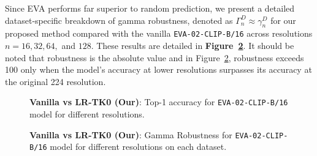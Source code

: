 Since EVA performs far superior to random prediction, we present a detailed dataset-specific breakdown of gamma robustness, denoted as $\Gamma^{D}_{n} \approx \gamma^{D}_{n}$ for our proposed method compared with the vanilla \texttt{EVA-02-CLIP-B/16} across resolutions $n = 16, 32, 64,$ and $128$. These results are detailed in \textbf{Figure~\ref{fig:gamma_variation}}. It should be noted that robustness is the absolute value and in Figure~\ref{fig:gamma_variation}, robustness exceeds 100 only when the model's accuracy at lower resolutions surpasses its accuracy at the original 224 resolution.



\begin{figure}[!t]
\centering
{}
\hfill
{}
\hfill
{}
\caption{\textbf{Vanilla vs LR-TK0 (Our)}: 
  Top-1 accuracy for \texttt{EVA-02-CLIP-B/16} model for different resolutions.
}    
\label{fig:dataset_wise_performance}
\end{figure}





\begin{figure}[!t]
\centering
{}
\hfill
{}
\hfill
{}
\hfill
{}
\caption{\textbf{Vanilla vs LR-TK0 (Our)}: 
  Gamma Robustness for \texttt{EVA-02-CLIP-B/16} model for different resolutions on each dataset.
}    
\label{fig:gamma_variation}
\end{figure}



